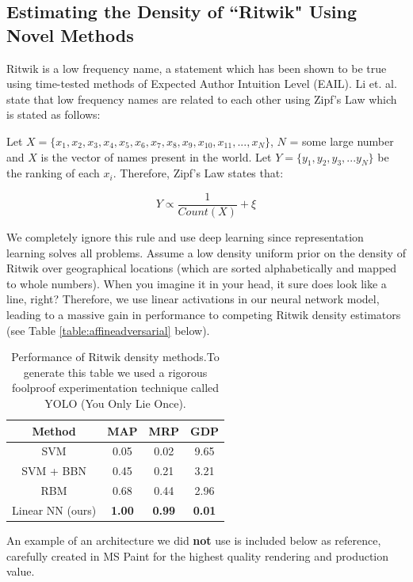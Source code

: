 \documentclass[]{article}
\begin{document}
\subsection{Estimating the Density of ``Ritwik" Using Novel Methods}
Ritwik is a low frequency name, a statement which has been shown to be true using time-tested methods of Expected Author Intuition Level (EAIL). Li et. al. \cite{Baby} state that low frequency names are related to each other using Zipf's Law which is stated as follows:

\vspace{2mm}
Let $X = \{x_1, x_2, x_3, x_4, x_5, x_6, x_7, x_8, x_9, x_{10}, x_{11}, ... , x_N\}$, $N$ = some large number and $X$ is the vector of names present in the world. Let $Y = \{y_1, y_2, y_3, ... y_N\}$ be the ranking of each $x_i$. Therefore, Zipf's Law states that:

\begin{equation}
Y \propto \frac{1}{Count(X)} + \xi
\end{equation}

We completely ignore this rule and use deep learning since representation learning solves all problems. Assume a low density uniform prior on the density of Ritwik over geographical locations (which are sorted alphabetically and mapped to whole numbers). When you imagine it in your head, it sure does look like a line, right? Therefore, we use linear activations in our neural network model, leading to a massive gain in performance to competing Ritwik density estimators (see Table \ref{table:affineadversarial} below).

\begin{table}[h]
\centering
\begin{tabular}{|c|c|c|c|}
	\hline
	\textbf{Method} & \textbf{MAP} & \textbf{MRP} & \textbf{GDP} \\
	\hline
	SVM & 0.05 & 0.02 & 9.65 \\
	\hline
	SVM + BBN & 0.45 & 0.21 & 3.21 \\
	\hline
	RBM & 0.68 & 0.44 & 2.96 \\
	\hline
	Linear NN (ours) & \textbf{1.00} & \textbf{0.99} & \textbf{0.01}\\
	\hline
\end{tabular}
\caption{Performance of Ritwik density methods.To generate this table we used a rigorous foolproof experimentation technique called YOLO (You Only Lie Once).}
\label{table:densitycomp}
\end{table}

An example of an architecture we did \textbf{not} use is included below as reference, carefully created in MS Paint for the highest quality rendering and production value.
\end{document}
